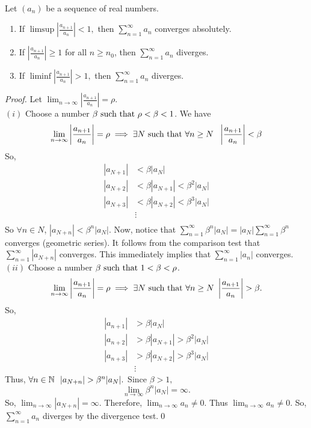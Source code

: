 \begin{theorem}  \leavevmode \\
    \label{thm3.34}
    Let $(a_n)$ be a sequence of real numbers.
    \begin{enumerate}[$(i)$]
        \item If $\limsup \left|\frac{a_{n+1}}{a_n}\right| < 1,$ then $\sum_{n=1}^{\infty}a_n$ converges absolutely.
        \item If $\left|\frac{a_{n+1}}{a_n}\right| \geq 1$ for all $n \geq n_0$, then $\sum_{n=1}^{\infty}a_n$ diverges.
        \item If $\liminf \left|\frac{a_{n+1}}{a_n}\right| > 1,$ then $\sum_{n=1}^{\infty} a_n$ diverges.
    \end{enumerate}
\end{theorem}
\begin{proof} \leavevmode
    Let $\lim_{n \to \infty} \left|\frac{a_{n+1}}{a_n}\right| = \rho.$ \\ 
    $(i)$ Choose a number $\beta \text{ such that } \rho < \beta < 1$. We have
    $$\lim_{n \to \infty} \left|\frac{a_{n+1}}{a_n}\right| = \rho \implies \exists N \text{ such that } \forall n \geq N ~~\left|\frac{a_{n+1}}{a_n}\right| < \beta$$
    So,
    \begin{align*}
        \left|a_{N+1}\right| &< \beta |a_N| \\
        \left|a_{N+2}\right| &< \beta |a_{N+1}| < \beta ^ 2 |a_N| \\
        \left|a_{N+3}\right| &< \beta |a_{N+2}| < \beta ^3 |a_N| \\
        &\vdots \\
    \end{align*}
    So $\forall n \in N$, $|a_{N+n}| < \beta ^n |a_N|.$ Now, notice that $\sum_{n=1}^{\infty} \beta ^n |a_N| = |a_N| \sum_{n=1}^{\infty} \beta ^n$ converges (geometric series). It follows from the comparison test that $\sum_{n=1}^{\infty}|a_{N+n}|$ converges. This immediately implies that $\sum_{n=1}^{\infty}|a_n|$ converges. \\
    $(ii)$ Choose a number $\beta \text{ such that } 1 < \beta < \rho$.
    $$\lim_{n\to \infty}\left|\frac{a_{n+1}}{a_n}\right| = \rho \implies \exists N \text{ such that } \forall n \geq N ~\left|\frac{a_{n+1}}{a_n}\right| > \beta.$$
    So,
    \begin{align*}
        |a_{n+1}| &> \beta |a_N| \\
        |a_{n+2}| &> \beta |a_{N+1}| > \beta^2 |a_N| \\
        |a_{n+3}| &> \beta |a_{N+2}| > \beta^3 |a_N| \\
        &\vdots
    \end{align*}
    Thus, $\forall n \in \mathbb{N} ~~|a_{N+n}| > \beta ^n |a_N|.$ Since $\beta > 1,$
    $$\lim_{n \to \infty} \beta ^n |a_N| = \infty.$$
    So, $\lim_{n\to \infty}|a_{N+n}| = \infty.$ Therefore, $\lim_{n\to \infty} a_n \not = 0.$ Thus $\lim_{n \to \infty}a_n \not = 0.$ So, $\sum_{n=1}^{\infty}a_n$ diverges by the divergence test.\qed
\end{proof}

